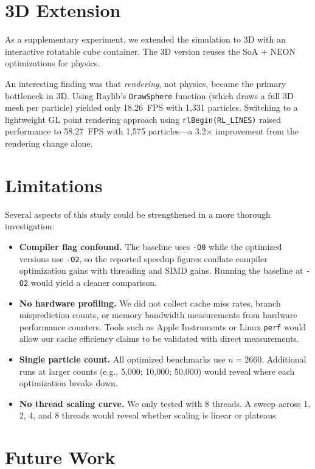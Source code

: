 \documentclass[12pt, a4paper]{article}
\begin{document}
\section{3D Extension}
As a supplementary experiment, we extended the simulation to 3D with an interactive rotatable cube container. The 3D version reuses the SoA + NEON optimizations for physics.

An interesting finding was that \emph{rendering}, not physics, became the primary bottleneck in 3D. Using Raylib's \texttt{DrawSphere} function (which draws a full 3D mesh per particle) yielded only 18.26~FPS with 1,331 particles. Switching to a lightweight GL point rendering approach using \texttt{rlBegin(RL\_LINES)} raised performance to 58.27~FPS with 1,575 particles---a 3.2$\times$ improvement from the rendering change alone.

\section{Limitations}

Several aspects of this study could be strengthened in a more thorough investigation:

\begin{itemize}
    \item \textbf{Compiler flag confound.} The baseline uses \texttt{-O0} while the optimized versions use \texttt{-O2}, so the reported speedup figures conflate compiler optimization gains with threading and SIMD gains. Running the baseline at \texttt{-O2} would yield a cleaner comparison.
    \item \textbf{No hardware profiling.} We did not collect cache miss rates, branch misprediction counts, or memory bandwidth measurements from hardware performance counters. Tools such as Apple Instruments or Linux \texttt{perf} would allow our cache efficiency claims to be validated with direct measurements.
    \item \textbf{Single particle count.} All optimized benchmarks use $n = 2660$. Additional runs at larger counts (e.g., 5,000; 10,000; 50,000) would reveal where each optimization breaks down.
    \item \textbf{No thread scaling curve.} We only tested with 8 threads. A sweep across 1, 2, 4, and 8 threads would reveal whether scaling is linear or plateaus.
\end{itemize}

\section{Future Work}
\end{document}

